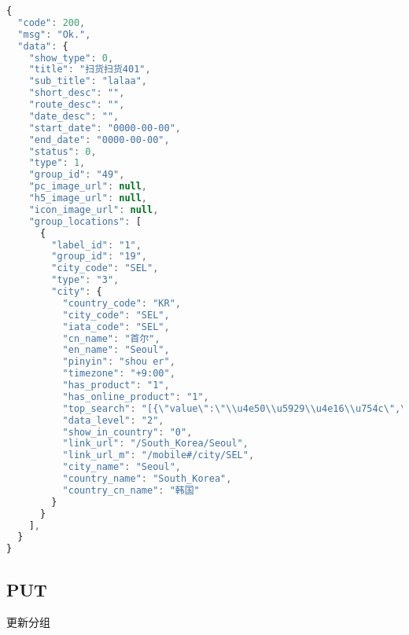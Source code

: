 \begin{lstlisting}[language=JavaScript]
{
  "code": 200,
  "msg": "Ok.",
  "data": {
    "show_type": 0,
    "title": "扫货扫货401",
    "sub_title": "lalaa",
    "short_desc": "",
    "route_desc": "",
    "date_desc": "",
    "start_date": "0000-00-00",
    "end_date": "0000-00-00",
    "status": 0,
    "type": 1,
    "group_id": "49",
    "pc_image_url": null,
    "h5_image_url": null,
    "icon_image_url": null,
    "group_locations": [
      {
        "label_id": "1",
        "group_id": "19",
        "city_code": "SEL",
        "type": "3",
        "city": {
          "country_code": "KR",
          "city_code": "SEL",
          "iata_code": "SEL",
          "cn_name": "首尔",
          "en_name": "Seoul",
          "pinyin": "shou er",
          "timezone": "+9:00",
          "has_product": "1",
          "has_online_product": "1",
          "top_search": "[{\"value\":\"\\u4e50\\u5929\\u4e16\\u754c\",\"display_order\":1},{\"value\":\"\\u6c11\\u4fd7\",\"display_order\":2},{\"value\":\"\\u4e71\\u6253\\u79c0\",\"display_order\":3},{\"value\":\"\\u660e\\u6d1e\",\"display_order\":4},{\"value\":\"\\u6c5d\\u77e3\\u5c9b\",\"display_order\":5},{\"value\":\"\\u4e1c\\u5927\\u95e8\",\"display_order\":6}]",
          "data_level": "2",
          "show_in_country": "0",
          "link_url": "/South_Korea/Seoul",
          "link_url_m": "/mobile#/city/SEL",
          "city_name": "Seoul",
          "country_name": "South_Korea",
          "country_cn_name": "韩国"
        }
      }
    ],
  }
}
\end{lstlisting}


\subsection{PUT}

更新分组

